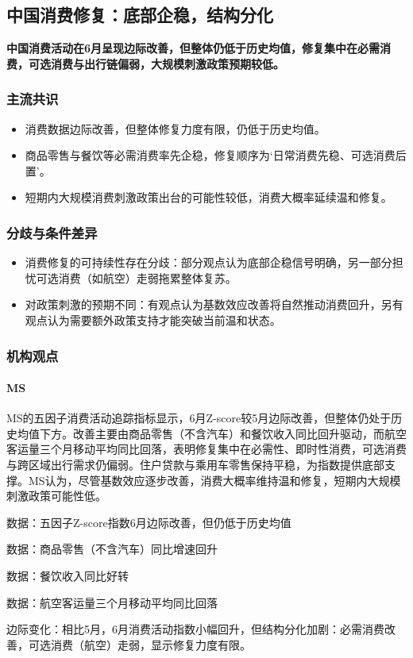 \documentclass[11pt]{ctexart}
\begin{document}
\subsection{中国消费修复：底部企稳，结构分化}
\textbf{中国消费活动在6月呈现边际改善，但整体仍低于历史均值，修复集中在必需消费，可选消费与出行链偏弱，大规模刺激政策预期较低。}
\subsubsection*{主流共识}
\begin{itemize}
  \item 消费数据边际改善，但整体修复力度有限，仍低于历史均值。
  \item 商品零售与餐饮等必需消费率先企稳，修复顺序为‘日常消费先稳、可选消费后置’。
  \item 短期内大规模消费刺激政策出台的可能性较低，消费大概率延续温和修复。
\end{itemize}
\subsubsection*{分歧与条件差异}
\begin{itemize}
  \item 消费修复的可持续性存在分歧：部分观点认为底部企稳信号明确，另一部分担忧可选消费（如航空）走弱拖累整体复苏。
  \item 对政策刺激的预期不同：有观点认为基数效应改善将自然推动消费回升，另有观点认为需要额外政策支持才能突破当前温和状态。
\end{itemize}
\subsubsection*{机构观点}
\paragraph{MS} MS的五因子消费活动追踪指标显示，6月Z-score较5月边际改善，但整体仍处于历史均值下方。改善主要由商品零售（不含汽车）和餐饮收入同比回升驱动，而航空客运量三个月移动平均同比回落，表明修复集中在必需性、即时性消费，可选消费与跨区域出行需求仍偏弱。住户贷款与乘用车零售保持平稳，为指数提供底部支撑。MS认为，尽管基数效应逐步改善，消费大概率维持温和修复，短期内大规模刺激政策可能性低。
{\small\color{refgray}数据：五因子Z-score指数6月边际改善，但仍低于历史均值\par}
{\small\color{refgray}数据：商品零售（不含汽车）同比增速回升\par}
{\small\color{refgray}数据：餐饮收入同比好转\par}
{\small\color{refgray}数据：航空客运量三个月移动平均同比回落\par}
{\small\color{refgray}边际变化：相比5月，6月消费活动指数小幅回升，但结构分化加剧：必需消费改善，可选消费（航空）走弱，显示修复力度有限。\par}
\end{document}
